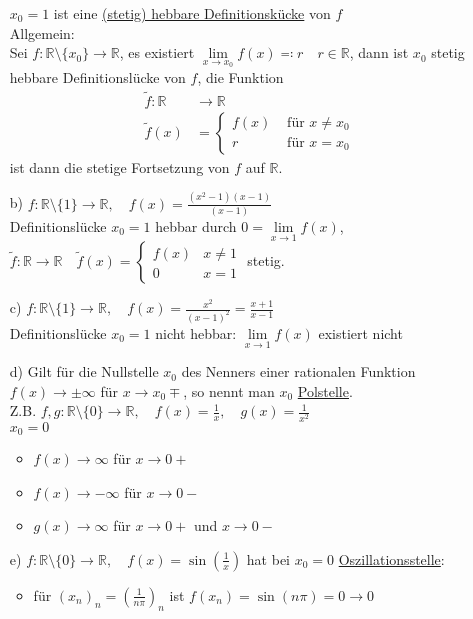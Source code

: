\documentclass[12pt, titlepage]{article}
\newcommand{\R}{\mathds{R}}
\renewcommand{\>}{\rightarrow}
\renewcommand{\*}{\cdot}
\begin{document}
\begin{itemize}
		$x_0=1$ ist eine \underline{(stetig) hebbare Definitionskücke} von $f$\\
		Allgemein:\\
		Sei $f\colon\R\setminus\{x_0\}\>\R$, es existiert $\lim\limits_{x\> x_0}f(x)\eqqcolon r\quad r\in\R$, dann ist $x_0$ stetig hebbare Definitionslücke von $f$, die Funktion
		\begin{align*}
			\tilde{f}\colon \R&\>\R\\
			\tilde{f}(x)&=\begin{cases}f(x)&\textrm{ für }x\neq x_0\\
			r&\textrm{ für }x=x_0
			\end{cases}
		\end{align*}
		ist dann die stetige Fortsetzung von $f$ auf $\R$.
		\item[b)] $f\colon\R\setminus\{1\}\>\R,\quad f(x)=\frac{(x^2-1)(x-1)}{(x-1)}$\\
		Definitionslücke $x_0=1$ hebbar durch $0=\lim\limits_{x\>1}f(x)$,\\
		$\tilde{f}\colon\R\>\R\quad\tilde{f}(x)=\begin{cases}f(x)&x\neq 1\\0&x=1
		\end{cases}$ stetig.
		\item[c)] $f\colon\R\setminus\{1\}\>\R,\quad f(x)=\frac{x^2}{(x-1)^2}=\frac{x+1}{x-1}$\\
		Definitionslücke $x_0=1$ nicht hebbar: $\lim\limits_{x\>1}f(x)$ existiert nicht
		\item[d)] Gilt für die Nullstelle $x_0$ des Nenners einer rationalen Funktion $f(x)\>\pm\infty$ für $x\> x_0\mp$, so nennt man $x_0$ \underline{Polstelle}.\\
		Z.B. $f,g\colon\R\setminus\{0\}\>\R,\quad f(x)=\frac{1}{x},\quad g(x)=\frac{1}{x^2}$\\
		$x_0=0$\\
		\begin{itemize}
			\item $f(x)\>\infty$ für $x\>0+$
			\item $f(x)\>-\infty$ für $x\>0-$
			\item $g(x)\>\infty$ für $x\>0+$ und $x\>0-$
		\end{itemize}
		\item[e)] $f\colon\R\setminus\{0\}\>\R,\quad f(x)=\sin(\frac{1}{x})$ hat bei $x_0=0$ \underline{Oszillationsstelle}:
		\begin{itemize}
			\item für $(x_n)_n=(\frac{1}{n\pi})_n$ ist $f(x_n)=\sin(n\pi)=0\>0$

\end{itemize}
\end{itemize}
\end{document}
